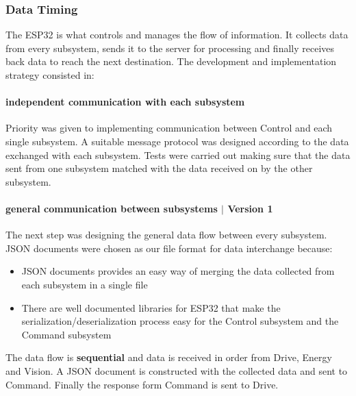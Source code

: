 \documentclass[10pt,twoside]{article}
\begin{document}
\subsubsection{Data Timing} 
The ESP32 is what controls and manages the flow of information. It collects data from every subsystem, sends it to the server for processing and finally receives back data to reach the next destination.
\smallbreak
The development and implementation strategy consisted in:

\paragraph{independent communication with each subsystem}
Priority was given to implementing communication between Control and each single subsystem. A suitable message protocol was designed according to the data exchanged with each subsystem. Tests were carried out making sure that the data sent from one subsystem matched with the data received on by the other subsystem.

\paragraph{general communication between subsystems $\vert$ Version 1}
The next step was designing the general data flow between every subsystem. JSON  documents were chosen as  our  file  format  for  data  interchange because:
\begin{itemize}
    \item JSON documents provides an easy way of merging the data collected from each subsystem in a single file
    \item There are well documented libraries for ESP32 that make the serialization/deserialization process easy for the Control subsystem and the Command subsystem
\end{itemize}
The data flow is \textbf{sequential} and data is received in order from Drive, Energy and Vision. A JSON document is constructed with the collected data and sent to Command. Finally the response form Command is sent to Drive.
\end{document}
